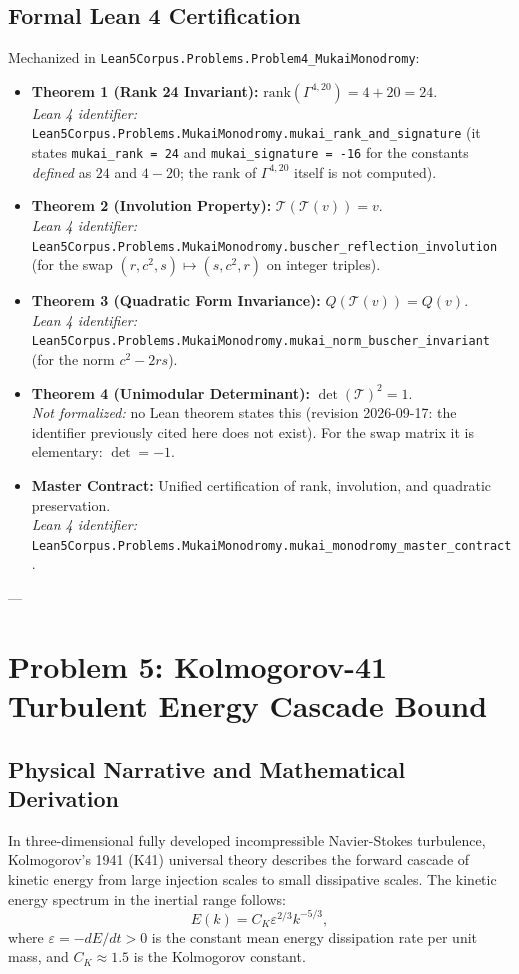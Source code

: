 \documentclass[11pt,a4paper]{article}
\begin{document}
\subsection{Formal Lean 4 Certification}
Mechanized in \texttt{Lean5Corpus.Problems.Problem4\_MukaiMonodromy}:
\begin{itemize}
    \item \textbf{Theorem 1 (Rank 24 Invariant):} $\mathrm{rank}(\Gamma^{4,20}) = 4 + 20 = 24$. \\
    \textit{Lean 4 identifier:} \texttt{Lean5Corpus.Problems.MukaiMonodromy.mukai\_rank\_and\_signature} (it states \texttt{mukai\_rank = 24} and \texttt{mukai\_signature = -16} for the constants \emph{defined} as $24$ and $4-20$; the rank of $\Gamma^{4,20}$ itself is not computed).
    \item \textbf{Theorem 2 (Involution Property):} $\mathcal{T}(\mathcal{T}(v)) = v$. \\
    \textit{Lean 4 identifier:} \texttt{Lean5Corpus.Problems.MukaiMonodromy.buscher\_reflection\_involution} (for the swap $(r,c^2,s)\mapsto(s,c^2,r)$ on integer triples).
    \item \textbf{Theorem 3 (Quadratic Form Invariance):} $Q(\mathcal{T}(v)) = Q(v)$. \\
    \textit{Lean 4 identifier:} \texttt{Lean5Corpus.Problems.MukaiMonodromy.mukai\_norm\_buscher\_invariant} (for the norm $c^2-2rs$).
    \item \textbf{Theorem 4 (Unimodular Determinant):} $\det(\mathcal{T})^2 = 1$. \\
    \textit{Not formalized:} no Lean theorem states this (revision 2026-09-17: the identifier previously cited here does not exist). For the swap matrix it is elementary: $\det=-1$.
    \item \textbf{Master Contract:} Unified certification of rank, involution, and quadratic preservation. \\
    \textit{Lean 4 identifier:} \texttt{Lean5Corpus.Problems.MukaiMonodromy.mukai\_monodromy\_master\_contract}.
\end{itemize}

---

\section{Problem 5: Kolmogorov-41 Turbulent Energy Cascade Bound}

\subsection{Physical Narrative and Mathematical Derivation}
In three-dimensional fully developed incompressible Navier-Stokes turbulence, Kolmogorov's 1941 (K41) universal theory describes the forward cascade of kinetic energy from large injection scales to small dissipative scales. The kinetic energy spectrum in the inertial range follows:
\begin{equation}
    E(k) = C_K \varepsilon^{2/3} k^{-5/3},
\end{equation}
where $\varepsilon = -dE/dt > 0$ is the constant mean energy dissipation rate per unit mass, and $C_K \approx 1.5$ is the Kolmogorov constant.
\end{document}
